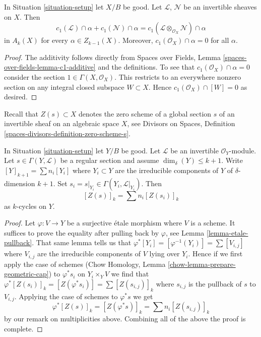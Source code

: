 \begin{lemma}
\label{lemma-c1-cap-additive}
In Situation \ref{situation-setup} let $X/B$ be good.
Let $\mathcal{L}$, $\mathcal{N}$ be an invertible sheaves on $X$.
Then
$$
c_1(\mathcal{L}) \cap \alpha  + c_1(\mathcal{N}) \cap \alpha =
c_1(\mathcal{L} \otimes_{\mathcal{O}_X} \mathcal{N}) \cap \alpha
$$
in $A_k(X)$ for every $\alpha \in Z_{k - 1}(X)$. Moreover,
$c_1(\mathcal{O}_X) \cap \alpha = 0$ for all $\alpha$.
\end{lemma}

\begin{proof}
The additivity follows directly from
Spaces over Fields, Lemma \ref{spaces-over-fields-lemma-c1-additive}
and the definitions. To see that $c_1(\mathcal{O}_X) \cap \alpha = 0$
consider the section $1 \in \Gamma(X, \mathcal{O}_X)$. This restricts
to an everywhere nonzero section on any integral closed subspace
$W \subset X$. Hence $c_1(\mathcal{O}_X) \cap [W] = 0$ as desired.
\end{proof}

\noindent
Recall that $Z(s) \subset X$ denotes the zero scheme of a global section
$s$ of an invertible sheaf on an algebraic space $X$, see
Divisors on Spaces, Definition \ref{spaces-divisors-definition-zero-scheme-s}.

\begin{lemma}
\label{lemma-prepare-geometric-cap}
In Situation \ref{situation-setup} let $Y/B$ be good.
Let $\mathcal{L}$ be an invertible $\mathcal{O}_Y$-module.
Let $s \in \Gamma(Y, \mathcal{L})$ be a regular section and
assume $\dim_\delta(Y) \leq k + 1$.
Write $[Y]_{k + 1} = \sum n_i[Y_i]$ where $Y_i \subset Y$ are the
irreducible components of $Y$ of $\delta$-dimension $k + 1$.
Set $s_i = s|_{Y_i} \in \Gamma(Y_i, \mathcal{L}|_{Y_i})$. Then
\begin{equation}
\label{equation-equal-as-cycles}
[Z(s)]_k =  \sum n_i[Z(s_i)]_k
\end{equation}
as $k$-cycles on $Y$.
\end{lemma}

\begin{proof}
Let $\varphi : V \to Y$ be a surjective \'etale morphism where $V$
is a scheme. It suffices to prove the equality after pulling back
by $\varphi$, see Lemma \ref{lemma-etale-pullback}.
That same lemma tells us that
$\varphi^*[Y_i] = [\varphi^{-1}(Y_i)] = \sum [V_{i, j}]$
where $V_{i, j}$ are the irreducible components of $V$ lying over $Y_i$.
Hence if we first apply the case of schemes
(Chow Homology, Lemma \ref{chow-lemma-prepare-geometric-cap}) to
$\varphi^*s_i$ on $Y_i \times_Y V$ we
find that $\varphi^*[Z(s_i)]_k = [Z(\varphi^*s_i)] =
\sum [Z(s_{i, j})]_k$ where $s_{i, j}$ is the pullback
of $s$ to $V_{i, j}$. Applying the case of schemes to $\varphi^*s$ we get
$$
\varphi^*[Z(s)]_k =
[Z(\varphi^*s)]_k =
\sum n_i[Z(s_{i, j})]_k
$$
by our remark on multiplicities above.
Combining all of the above the proof is complete.
\end{proof}

